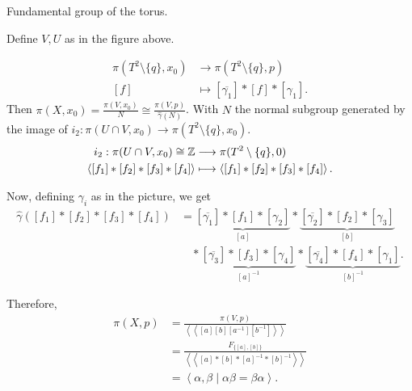 \begin{eg}
    Fundamental group of the torus.

    \begin{figure}[H]
        \centering
        \label{fig:fundamental-group-of-the-torus-using-van-kampen}
    \end{figure}
    Define $V, U$ as in the figure above.

    \begin{align*}
        \pi(T^2 \setminus \{q\}, x_0) &\longrightarrow  \pi(T^2 \setminus \{q\} , p) \\
        [f] &\longmapsto [ \overline{\gamma_1}] * [f] * [\gamma_1]
    .\end{align*}
    Then $\pi(X, x_0) = \frac{\pi(V, x_0)}{N} \cong \frac{\pi(V, p)}{\hat{\gamma}(N)}$.
    With $N$ the normal subgroup generated by the image of  $i_2: \pi(U \cap V, x_0) \to  \pi(T^2 \setminus \{ q\} , x_0)$.
\begin{align*}
    i_2  :  \pi(U \cap V, x_0) \cong \mathbb{Z} &\longrightarrow  \pi(T^2 \setminus \{ q\} , 0)\\
    \left<[f_1] * [f_2] * [f_3] * [f_4] \right>&\longmapsto \left<[f_1] * [f_2] * [f_3] * [f_4] \right>
.\end{align*}

\begin{figure}[H]
    \centering
    \label{fig:fundamental-group-of-the-torus-using-van-kampen-2}
\end{figure}

Now, defining  $\gamma_i$ as in the picture, we get
\begin{align*}
    \hat{\gamma}([f_1] *[f_2] * [f_3] * [f_4]) &= 
    \underbrace{[\overline{\gamma_1}]
    * [f_1] * [\gamma_2]}_{[a]} *
    \underbrace{[\overline{\gamma_2}] * [f_2] * [\gamma_3]}_{[b]}\\
                                               & \quad * \underbrace{[\overline{\gamma_3}] * [f_3] * [\gamma_4]}_{[a]^{-1}} *
    \underbrace{[\overline{\gamma_4}] * [f_4] * [\gamma_1]}_{[b]^{-1}}
.\end{align*} 

Therefore,
\begin{align*}
    \pi(X, p) &= \frac{\pi(V, p)}{\left<\left<[a][b][a^{-1}][b^{-1}] \right> \right>}\\ &= \frac{F_{\{[a], [b]\} }}{\left<\left<[a] * [b] * [a]^{-1} * [b] ^{-1} \right> \right>} \\&= \left<\alpha, \beta  \mid  \alpha\beta = \beta\alpha \right>
.\end{align*} 
\end{eg}
